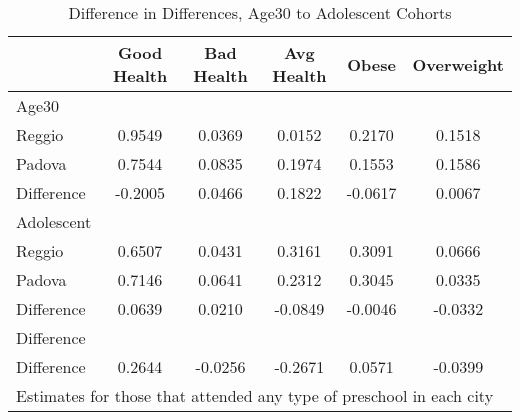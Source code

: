 \begin{table}[htbp]\centering
\caption{Difference in Differences, Age30 to Adolescent Cohorts}
\begin{tabular}{l*{5}{c}}
\hline\hline
            & Good Health&  Bad Health&  Avg Health&       Obese&  Overweight\\
\hline
Age30       &            &            &            &            &            \\
Reggio      &      0.9549&      0.0369&      0.0152&      0.2170&      0.1518\\
Padova      &      0.7544&      0.0835&      0.1974&      0.1553&      0.1586\\
Difference  &     -0.2005&      0.0466&      0.1822&     -0.0617&      0.0067\\
\hline
Adolescent  &            &            &            &            &            \\
Reggio      &      0.6507&      0.0431&      0.3161&      0.3091&      0.0666\\
Padova      &      0.7146&      0.0641&      0.2312&      0.3045&      0.0335\\
Difference  &      0.0639&      0.0210&     -0.0849&     -0.0046&     -0.0332\\
\hline
Difference  &            &            &            &            &            \\
Difference  &      0.2644&     -0.0256&     -0.2671&      0.0571&     -0.0399\\
\hline\hline
\multicolumn{6}{l}{\footnotesize Estimates for those that attended any type of preschool in each city}\\
\end{tabular}
\end{table}
